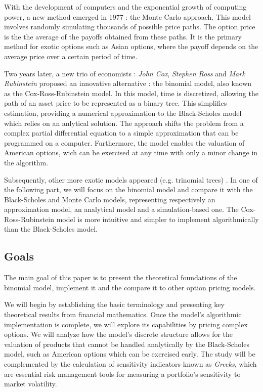 With the development of computers and the exponential growth of computing power, a new method emerged in 1977 : the Monte Carlo approach. 
This model involves randomly simulating thousands of possible price paths.
The option price is the the average of the payoffs obtained from these paths. \cite{MonteCarloPricing}
It is the primary method for exotic options such as Asian options, where the payoff depends on the average price over a certain period of time.\cite{AsianOption}

Two years later, a new trio of economists :  \textit{John Cox}, \textit{Stephen Ross} and \textit{Mark Rubinstein} proposed an innovative alternative : the binomial model, also known as the Cox-Ross-Rubinstein model.
In this model, time is discretized, allowing the path of an asset price to be represented as a binary tree.
This simplifies estimation, providing a numerical approximation to the Black-Scholes model which relies on an anlytical solution.
The approach shifts the problem from a complex partial differential equation to a simple approximation that can be programmed on a computer.
Furthermore, the model enables the valuation of American options, wich can be exercised at any time with only a minor change in the algorithm. \cite{OptionPricingASimplifiedApproach}

Subsequently, other more exotic models appeared (e.g. trinomial trees) \cite{TrinomialTree}.
In one of the following part, we will focus on the binomial model and compare it with the Black-Scholes and Monte Carlo models, representing respectively an approximation model, an analytical model and a simulation-based one.
The Cox-Ross-Rubinstein model is more intuitive and simpler to implement algorithmically than the Black-Scholes model.

\subsection{Goals}

The main goal of this paper is to present the theoretical foundations of the binomial model, implement it and the compare it to other option pricing models.

We will begin by establishing the basic terminology and presenting key theoretical results from financial mathematics.
Once the model's algorithmic implementation is complete, we will explore its capabilities by pricing complex options.
We will analyze how the model's discrete structure allows for the valuation of products that cannot be handled analytically by the Black-Scholes model, such as American options which can be exercised early.
The study will be complemented by the calculation of sensitivity indicators known as \textit{Greeks}, which are essential risk management tools for measuring a portfolio's sensitivity to market volatility.

